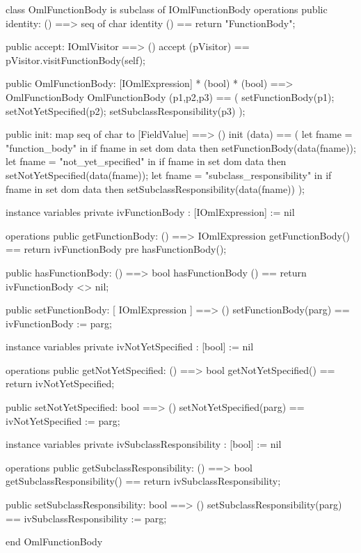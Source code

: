 \begin{vdm_al}
class OmlFunctionBody is subclass of IOmlFunctionBody
operations
  public identity: () ==> seq of char
  identity () == return "FunctionBody";

  public accept: IOmlVisitor ==> ()
  accept (pVisitor) == pVisitor.visitFunctionBody(self);

  public OmlFunctionBody:
      [IOmlExpression] *
      (bool) *
      (bool) ==> OmlFunctionBody
  OmlFunctionBody (p1,p2,p3) == 
   ( setFunctionBody(p1);
     setNotYetSpecified(p2);
     setSubclassResponsibility(p3) );

  public init: map seq of char to [FieldValue] ==> ()
  init (data) ==
    ( let fname = "function_body" in
        if fname in set dom data
        then setFunctionBody(data(fname));
      let fname = "not_yet_specified" in
        if fname in set dom data
        then setNotYetSpecified(data(fname));
      let fname = "subclass_responsibility" in
        if fname in set dom data
        then setSubclassResponsibility(data(fname)) );

instance variables
  private ivFunctionBody : [IOmlExpression] := nil

operations
  public getFunctionBody: () ==> IOmlExpression
  getFunctionBody() == return ivFunctionBody
    pre hasFunctionBody();

  public hasFunctionBody: () ==> bool
  hasFunctionBody () == return ivFunctionBody <> nil;

  public setFunctionBody: [ IOmlExpression ] ==> ()
  setFunctionBody(parg) == ivFunctionBody := parg;

instance variables
  private ivNotYetSpecified : [bool] := nil

operations
  public getNotYetSpecified: () ==> bool
  getNotYetSpecified() == return ivNotYetSpecified;

  public setNotYetSpecified: bool ==> ()
  setNotYetSpecified(parg) == ivNotYetSpecified := parg;

instance variables
  private ivSubclassResponsibility : [bool] := nil

operations
  public getSubclassResponsibility: () ==> bool
  getSubclassResponsibility() == return ivSubclassResponsibility;

  public setSubclassResponsibility: bool ==> ()
  setSubclassResponsibility(parg) == ivSubclassResponsibility := parg;

end OmlFunctionBody
\end{vdm_al}

